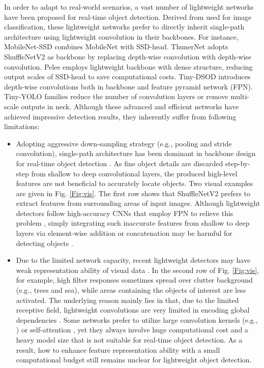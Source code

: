 \documentclass[lettersize,journal]{IEEEtran}
\begin{document}
In order to adapt to real-world scenarios, a vast number of lightweight networks \cite{howard2017mobilenets, sandler2018mobilenetv2,qin2019thundernet} have been proposed for real-time object detection. Derived from \cite{howard2017mobilenets, sandler2018mobilenetv2, ma2018shufflenet} used for image classification, these lightweight networks prefer to directly inherit single-path architecture using lightweight convolution in their backbones. For instance, MobileNet-SSD \cite{howard2017mobilenets,sandler2018mobilenetv2} combines MobileNet with SSD-head. ThunerNet \cite{qin2019thundernet} adopts ShuffleNetV2 \cite{ma2018shufflenet} as backbone by replacing  depth-wise convolution with  depth-wise convolution. Pelee \cite{Pelee} employs lightweight backbone with dense structure, reducing output scales of SSD-head to save computational costs. Tiny-DSOD \cite{li2018tiny} introduces depth-wise convolutions both in backbone and feature pyramid network (FPN). Tiny-YOLO families \cite{redmon2017yolo9000,redmon2018yolov3,wang2021scaled} reduce the number of convolution layers or remove multi-scale outputs in neck. Although these advanced and efficient networks have achieved impressive detection results, they inherently suffer from following limitations:

\begin{itemize}
	\item Adopting aggressive down-sampling strategy (e.g., pooling and stride convolution), single-path architecture has been dominant in backbone design for real-time object detection \cite{sandler2018mobilenetv2,zhang2018shufflenet,wang2021scaled}. As fine object details are discarded step-by-step from shallow to deep convolutional layers, the produced high-level features are not beneficial to accurately locate objects. Two visual examples are given in Fig. \ref{Fig:vis}. The first row shows that ShuffleNetV2 \cite{ma2018shufflenet} prefers to extract features from surrounding areas of input images. Although lightweight detectors follow high-accuracy CNNs that employ FPN to relieve this problem \cite{li2018tiny}, simply integrating such inaccurate features from shallow to deep layers via element-wise addition or concatenation may be harmful for detecting objects \cite{li2020semantic}.
	\item Due to the limited network capacity, recent lightweight detectors may have weak representation ability of visual data \cite{mehta2021mobilevit}. In the second row of Fig. \ref{Fig:vis}, for example, high filter responses sometimes spread over clutter background (e.g., trees and sea), while areas containing the objects of interest are less activated. The underlying reason mainly lies in that, due to the limited receptive field, lightweight convolutions are very limited in encoding global dependencies \cite{mehta2021mobilevit}. Some networks prefer to utilize large convolution kernels (e.g., ) \cite{peng2017large,ding2022scaling} or self-attention \cite{wang2018non}, yet they always involve huge computational cost and a heavy model size that is not suitable for real-time object detection. As a result, how to enhance feature representation ability with a small computational budget still remains unclear for lightweight object detection.
\end{itemize}
\end{document}
